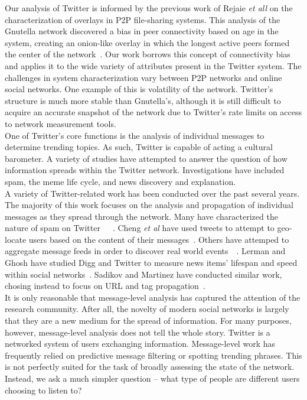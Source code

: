 Our analysis of Twitter is informed by the previous work of Rejaie \textit{et all} on the characterization of overlays in P2P file-sharing systems.  This analysis of the Gnutella network discovered a bias in peer connectivity based on age in the system, creating an onion-like overlay in which the longest active peers formed the center of the network~\cite{RS05}.  Our work borrows this concept of connectivity bias and applies it to the wide variety of attributes present in the Twitter system.  The challenges in system characterization vary between P2P networks and online social networks.  One example of this is volatility of the network.  Twitter's structure is much more stable than Gnutella's, although it is still difficult to acquire an accurate snapshot of the network due to Twitter's rate limits on access to network measurement tools.\\
One of Twitter's core functions is the analysis of individual messages to determine trending topics.  As such, Twitter is capable of acting a cultural barometer.  A variety of studies have attempted to answer the question of how information spreads within the Twitter network.  Investigations have included spam, the meme life cycle, and news discovery and explanation.\\
A variety of Twitter-related work has been conducted over the past several years.  The majority of this work focuses on the analysis and propagation of individual messages as they spread through the network.  Many have characterized the nature of spam on Twitter~\cite{GTPS10}~\cite{Yardi_Romero_Schoenebeck_Boyd_2010}~\cite{DBLP:journals/corr/abs-1011-3768}.  Cheng \textit{et al} have used tweets to attempt to geo-locate users based on the content of their messages~\cite{CCL10}.  Others have attemped to aggregate message feeds in order to discover real world events~\cite{Lee:2010:MGR:1867699.1867701}~\cite{Fujisaka:2010:MGA:1880853.1880896}.  Lerman and Ghosh have studied Digg and Twitter to measure news items' lifespan and speed within social networks~\cite{LG10}.  Sadikov and Martinez have conducted similar work, chosing instead to focus on URL and tag propagation~\cite{SM09}.\\
It is only reasonable that message-level analysis has captured the attention of the research community.  After all, the novelty of modern social networks is largely that they are a new medium for the spread of information.  For many purposes, however, message-level analysis does not tell the whole story.  Twitter is a networked system of users exchanging information.  Message-level work has frequently relied on predictive message filtering or spotting trending phrases.  This is not perfectly suited for the task of broadly assessing the state of the network.  Instead, we ask a much simpler question -- what type of people are different users choosing to listen to?\\
